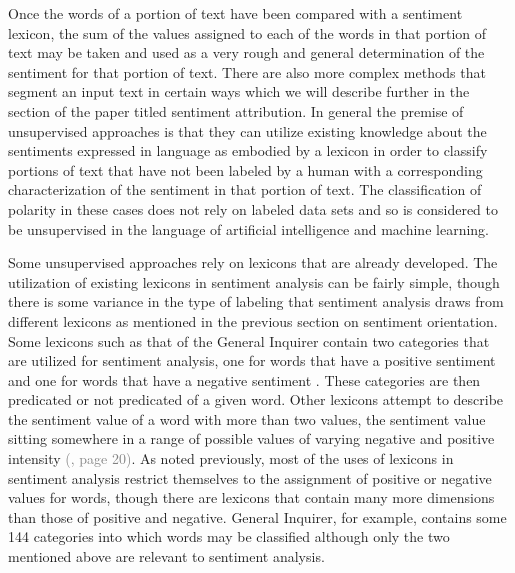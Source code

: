 \documentclass[letterpaper, 10 pt, conference]{ieeeconf}
\begin{document}
Once the words of a portion of text have been compared with a sentiment lexicon, the sum of the values assigned to each of the words in that portion of text may be taken and used as a very rough and general determination of the sentiment for that portion of text. There are also more complex methods that segment an input text in certain ways which we will describe further in the section of the paper titled sentiment attribution. In general the premise of unsupervised approaches is that they can utilize existing knowledge about the sentiments expressed in language as embodied by a lexicon in order to classify portions of text that have not been labeled by a human with a corresponding characterization of the sentiment in that portion of text. The classification of polarity in these cases does not rely on labeled data sets and so is considered to be unsupervised in the language of artificial intelligence and machine learning.

Some unsupervised approaches rely on lexicons that are already developed. The utilization of existing lexicons in sentiment analysis can be fairly simple, though there is some variance in the type of labeling that sentiment analysis draws from different lexicons as mentioned in the previous section on sentiment orientation. Some lexicons such as that of the General Inquirer contain two categories that are utilized for sentiment analysis, one for words that have a positive sentiment and one for words that have a negative sentiment \textcolor{gray}{\cite{Buvac}}. These categories are then predicated or not predicated of a given word. Other lexicons attempt to describe the sentiment value of a word with more than two values, the sentiment value sitting somewhere in a range of possible values of varying negative and positive intensity \textcolor{gray}{(\cite{RaviRavi}, page 20)}. As noted previously, most of the uses of lexicons in sentiment analysis restrict themselves to the assignment of positive or negative values for words, though there are lexicons that contain many more dimensions than those of positive and negative. General Inquirer, for example, contains some 144 categories into which words may be classified although only the two mentioned above are relevant to sentiment analysis.
\end{document}
